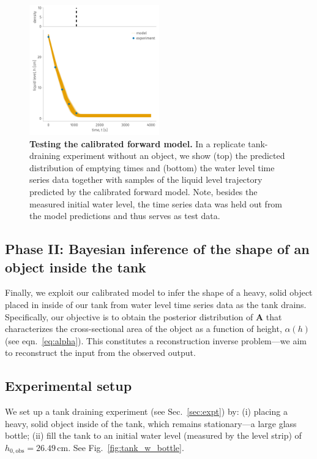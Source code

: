 \documentclass[openacc]{rsproca_new}%
\begin{document}
\begin{figure}[h!]
    \centering
    	\includegraphics[width=0.5\textwidth]{../test.pdf}
    \caption{
      \textbf{Testing the calibrated forward model.}
      In a replicate tank-draining experiment without an object, we show (top) the predicted distribution of emptying times and (bottom) the water level time series data together with samples of the liquid level trajectory predicted by the calibrated forward model. Note, besides the measured initial water level, the time series data was held out from the model predictions and thus serves as test data.
      } \label{fig:test}
\end{figure}

\subsection{Phase II: Bayesian inference of the shape of an object inside the tank} \label{sec:phaseII}
Finally, we exploit our calibrated model to infer the shape of a heavy, solid object placed in inside of our tank from water level time series data as the tank drains.
Specifically, our objective is to obtain the posterior distribution of $\mathbf{A}$ that characterizes the cross-sectional area of the object as a function of height, $\alpha(h)$ (see eqn.~\ref{eq:alpha}).
This constitutes a reconstruction inverse problem---we aim to reconstruct the input from the observed output.

\subsection{Experimental setup}
We set up a tank draining experiment (see Sec.~\ref{sec:expt}) by:
(i) placing a heavy, solid object inside of the tank, which remains stationary---a large glass bottle;
(ii) fill the tank to an initial water level (measured by the level strip) of $h_{0, \text{obs}}=26.49$\,cm. 
See Fig.~\ref{fig:tank_w_bottle}.
\end{document}
